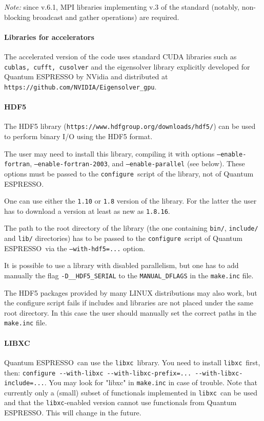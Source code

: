 \documentclass[12pt,a4paper]{article}
\def\qe{{\sc Quantum ESPRESSO}}
\def\configure{\texttt{configure}}
\def\libxc{\texttt{libxc}}
\begin{document}
{\em Note:} since v.6.1, MPI libraries implementing v.3 of the standard
(notably, non-blocking broadcast and gather operations) are required.

\paragraph{Libraries for accelerators}
The accelerated version of the code uses standard CUDA libraries such as
\texttt{cublas, cufft, cusolver} and the eigensolver library explicitly 
developed for \qe{} by NVidia and distributed at \texttt{https://github.com/NVIDIA/Eigensolver\_gpu}.

\paragraph {HDF5}
The HDF5 library (\texttt{https://www.hdfgroup.org/downloads/hdf5/})
can be used to perform binary I/O using the  HDF5 format.  

The user may need to install this library, compiling it
with options \texttt{--enable-fortran}, \texttt{--enable-fortran-2003},
and \texttt{--enable-parallel} (see below). These options must be passed
to the \configure{}ript of the library, not of \qe. 

One can use either the \texttt{1.10} or \texttt{1.8} version of the library. 
For the latter the user has to download a version at least as new as \texttt{1.8.16}.    

The path to the root directory of the library (the one containing \texttt{bin/},
\texttt{include/} and \texttt{lib/} directories) has to be passed to the
\configure{}ript of \qe\ via the \texttt{--with-hdf5=...} option.

It is possible to use a library with disabled parallelism, 
but one has to add manually the flag \texttt{-D\_\_HDF5\_SERIAL}
to the \texttt{MANUAL\_DFLAGS} in the \texttt{make.inc} file. 

The HDF5 packages provided by many LINUX distributions may also work,
but the configure script fails if includes and libraries are not placed
under the same root directory. In this case the user should manually set
the correct paths in the \texttt{make.inc} file.

\paragraph{LIBXC}
\qe\ can use the \libxc\ library. You need to install \libxc\ first, then:
\verb|configure --with-libxc --with-libxc-prefix=... --with-libxc-include=...|.
You may look for "libxc" in \texttt{make.inc}  in case of trouble. Note that
currently only a (small) subset of functionals implemented in \libxc\ can be
used and that the \libxc-enabled version cannot use functionals from \qe.
This will change in the future.
\end{document}
